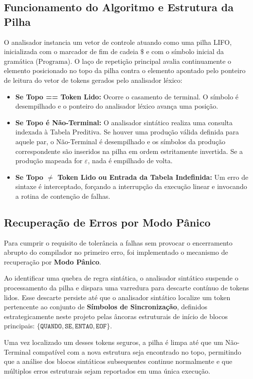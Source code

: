 \documentclass[12pt, a4paper]{article}
\begin{document}
\subsection{Funcionamento do Algoritmo e Estrutura da Pilha}
O analisador instancia um vetor de controle atuando como uma pilha LIFO, inicializada com o marcador de fim de cadeia $\$$ e com o símbolo inicial da gramática ($\text{Programa}$). O laço de repetição principal avalia continuamente o elemento posicionado no topo da pilha contra o elemento apontado pelo ponteiro de leitura do vetor de tokens gerados pelo analisador léxico:

\begin{itemize}
    \item \textbf{Se Topo == Token Lido:} Ocorre o casamento de terminal. O símbolo é desempilhado e o ponteiro do analisador léxico avança uma posição.
    \item \textbf{Se Topo é Não-Terminal:} O analisador sintático realiza uma consulta indexada à Tabela Preditiva. Se houver uma produção válida definida para aquele par, o Não-Terminal é desempilhado e os símbolos da produção correspondente são inseridos na pilha em ordem estritamente invertida. Se a produção mapeada for $\varepsilon$, nada é empilhado de volta.
    \item \textbf{Se Topo $\neq$ Token Lido ou Entrada da Tabela Indefinida:} Um erro de sintaxe é interceptado, forçando a interrupção da execução linear e invocando a rotina de contenção de falhas.
\end{itemize}

\subsection{Recuperação de Erros por Modo Pânico}
Para cumprir o requisito de tolerância a falhas sem provocar o encerramento abrupto do compilador no primeiro erro, foi implementado o mecanismo de recuperação por \textbf{Modo Pânico}. 

Ao identificar uma quebra de regra sintática, o analisador sintático suspende o processamento da pilha e dispara uma varredura para descarte contínuo de tokens lidos. Esse descarte persiste até que o analisador sintático localize um token pertencente ao conjunto de \textbf{Símbolos de Sincronização}, definidos estrategicamente neste projeto pelas âncoras estruturais de início de blocos principais: $\{\texttt{QUANDO}, \texttt{SE}, \texttt{ENTAO}, \texttt{EOF}\}$. 

Uma vez localizado um desses tokens seguros, a pilha é limpa até que um Não-Terminal compatível com a nova estrutura seja encontrado no topo, permitindo que a análise dos blocos sintáticos subsequentes continue normalmente e que múltiplos erros estruturais sejam reportados em uma única execução.
\end{document}
